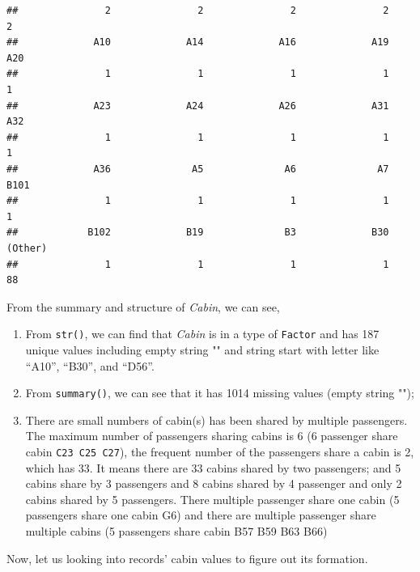 \documentclass[
]{book}
\newenvironment{Shaded}{\begin{snugshade}}{\end{snugshade}}
\newcommand{\CommentTok}[1]{\textcolor[rgb]{0.56,0.35,0.01}{\textit{#1}}}
\newcommand{\DecValTok}[1]{\textcolor[rgb]{0.00,0.00,0.81}{#1}}
\newcommand{\KeywordTok}[1]{\textcolor[rgb]{0.13,0.29,0.53}{\textbf{#1}}}
\newcommand{\NormalTok}[1]{#1}
\newcommand{\OperatorTok}[1]{\textcolor[rgb]{0.81,0.36,0.00}{\textbf{#1}}}
\newcommand{\StringTok}[1]{\textcolor[rgb]{0.31,0.60,0.02}{#1}}
\begin{document}
\begin{verbatim}
##               2               2               2               2               2 
##             A10             A14             A16             A19             A20 
##               1               1               1               1               1 
##             A23             A24             A26             A31             A32 
##               1               1               1               1               1 
##             A36              A5              A6              A7            B101 
##               1               1               1               1               1 
##            B102             B19              B3             B30         (Other) 
##               1               1               1               1              88
\end{verbatim}

From the summary and structure of \emph{Cabin}, we can see,

\begin{enumerate}
\def\labelenumi{\arabic{enumi}.}
\item
  From \texttt{str()}, we can find that \emph{Cabin} is in a type of \texttt{Factor} and has 187 unique values including empty string "" and string start with letter like ``A10'', ``B30'', and ``D56''.
\item
  From \texttt{summary()}, we can see that it has 1014 missing values (empty string "");
\item
  There are small numbers of cabin(s) has been shared by multiple passengers. The maximum number of passengers sharing cabins is 6 (6 passenger share cabin \texttt{C23\ C25\ C27}), the frequent number of the passengers share a cabin is 2, which has 33. It means there are 33 cabins shared by two passengers; and 5 cabins share by 3 passengers and 8 cabins shared by 4 passenger and only 2 cabins shared by 5 passengers. There multiple passenger share one cabin (5 passengers share one cabin G6) and there are multiple passenger share multiple cabins (5 passengers share cabin B57 B59 B63 B66)
\end{enumerate}

Now, let us looking into records' cabin values to figure out its formation.

\begin{Shaded}
\end{Shaded}
\end{document}
